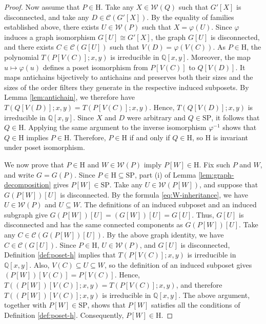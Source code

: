 \documentclass[11pt,a4paper]{article}
\begin{document}
\begin{proof}
Now assume that $P\in\mathrm H$.
Take any $X\in\mathcal W(Q)$ such that $G'[X]$ is disconnected,
and take any $D\in\mathcal C(G'[X])$.
By the equality of families established above,
there exists $U\in\mathcal W(P)$ such that $X=\varphi(U)$.
Since $\varphi$ induces a graph isomorphism
$G[U]\cong G'[X]$, the graph $G[U]$ is disconnected,
and there exists $C\in\mathcal C(G[U])$ such that
$V(D)=\varphi(V(C))$.
As $P\in\mathrm H$, the polynomial $T(P[V(C)];x,y)$
is irreducible in $\mathbb Q[x,y]$.
Moreover, the map $u\mapsto\varphi(u)$ defines a poset isomorphism
from $P[V(C)]$ to $Q[V(D)]$.
It maps antichains bijectively to antichains and preserves
both their sizes and the sizes of the order filters
they generate in the respective induced subposets.
By Lemma \ref{lem:antichain}, we therefore have
$T(Q[V(D)];x,y)=T(P[V(C)];x,y)$.
Hence, $T(Q[V(D)];x,y)$ is irreducible in $\mathbb Q[x,y]$.
Since $X$ and $D$ were arbitrary and $Q\in\mathrm{SP}$,
it follows that $Q\in\mathrm H$.
Applying the same argument to the inverse isomorphism $\varphi^{-1}$
shows that $Q\in\mathrm H$ implies $P\in\mathrm H$.
Therefore, $P\in\mathrm H$ if and only if $Q\in\mathrm H$,
so $\mathrm H$ is invariant under poset isomorphism.

We now prove that $P\in\mathrm H$ and $W\in\mathcal W(P)$
imply $P[W]\in\mathrm H$. Fix such $P$ and $W$, and write $G=G(P)$.
Since $P\in\mathrm H\subseteq\mathrm{SP}$,
part \textup{(i)} of Lemma \ref{lem:graph-decomposition} gives $P[W]\in\mathrm{SP}$.
Take any $U\in\mathcal W(P[W])$, and suppose that $G(P[W])[U]$ is disconnected.
By the formula \eqref{eq:W-inheritance}, we have $U\in\mathcal W(P)$ and $U\subseteq W$.
The definitions of an induced subposet and an induced subgraph give $G(P[W])[U]=(G[W])[U]=G[U]$.
Thus, $G[U]$ is disconnected and has the same connected components as $G(P[W])[U]$.
Take any $C\in\mathcal C(G(P[W])[U])$.
By the above graph identity, we have $C\in\mathcal C(G[U])$.
Since $P\in\mathrm H$, $U\in\mathcal W(P)$,
and $G[U]$ is disconnected, Definition \ref{def:poset-h}
implies that $T(P[V(C)];x,y)$ is irreducible in $\mathbb Q[x,y]$.
Also, $V(C)\subseteq U\subseteq W$, so the definition
of an induced subposet gives $(P[W])[V(C)]=P[V(C)]$.
Hence, $T((P[W])[V(C)];x,y)=T(P[V(C)];x,y)$,
and therefore $T((P[W])[V(C)];x,y)$ is irreducible in $\mathbb Q[x,y]$.
The above argument, together with $P[W]\in\mathrm{SP}$,
shows that $P[W]$ satisfies all the conditions of Definition \ref{def:poset-h}.
Consequently, $P[W]\in\mathrm H$.


\end{proof}
\end{document}
